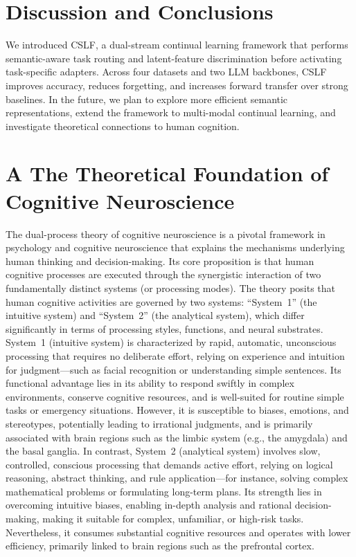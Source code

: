 \documentclass[11pt]{article}
\begin{document}
\section{Discussion and Conclusions}
We introduced CSLF, a dual-stream continual learning framework that performs semantic-aware task routing and latent-feature discrimination before activating task-specific adapters. Across four datasets and two LLM backbones, CSLF improves accuracy, reduces forgetting, and increases forward transfer over strong baselines.
In the future, we plan to explore more efficient semantic representations, extend the framework to multi-modal continual learning, and investigate theoretical connections to human cognition.




\clearpage
\appendix
\label{sec:appendix}



\section*{A  The Theoretical Foundation of Cognitive Neuroscience}

The dual-process theory of cognitive neuroscience is a pivotal framework in psychology and cognitive neuroscience that explains the mechanisms underlying human thinking and decision-making. Its core proposition is that human cognitive processes are executed through the synergistic interaction of two fundamentally distinct systems (or processing modes). The theory posits that human cognitive activities are governed by two systems: ``System~1'' (the intuitive system) and ``System~2'' (the analytical system), which differ significantly in terms of processing styles, functions, and neural substrates. System~1 (intuitive system) is characterized by rapid, automatic, unconscious processing that requires no deliberate effort, relying on experience and intuition for judgment---such as facial recognition or understanding simple sentences. Its functional advantage lies in its ability to respond swiftly in complex environments, conserve cognitive resources, and is well-suited for routine simple tasks or emergency situations. However, it is susceptible to biases, emotions, and stereotypes, potentially leading to irrational judgments, and is primarily associated with brain regions such as the limbic system (e.g., the amygdala) and the basal ganglia. In contrast, System~2 (analytical system) involves slow, controlled, conscious processing that demands active effort, relying on logical reasoning, abstract thinking, and rule application---for instance, solving complex mathematical problems or formulating long-term plans. Its strength lies in overcoming intuitive biases, enabling in-depth analysis and rational decision-making, making it suitable for complex, unfamiliar, or high-risk tasks. Nevertheless, it consumes substantial cognitive resources and operates with lower efficiency, primarily linked to brain regions such as the prefrontal cortex.
\end{document}
